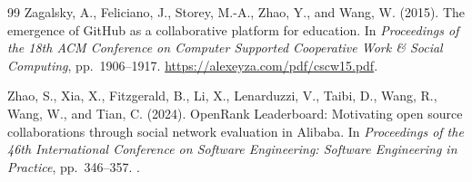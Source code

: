 \begin{thebibliography}{99}
Zagalsky, A., Feliciano, J., Storey, M.-A., Zhao, Y., and Wang, W. (2015).
The emergence of GitHub as a collaborative platform for education.
In \emph{Proceedings of the 18th ACM Conference on Computer Supported Cooperative Work \& Social Computing}, pp.~1906--1917.
\url{https://alexeyza.com/pdf/cscw15.pdf}.

Zhao, S., Xia, X., Fitzgerald, B., Li, X., Lenarduzzi, V., Taibi, D., Wang, R., Wang, W., and Tian, C. (2024).
OpenRank Leaderboard: Motivating open source collaborations through social network evaluation in Alibaba.
In \emph{Proceedings of the 46th International Conference on Software Engineering: Software Engineering in Practice}, pp.~346--357.
.
\end{thebibliography}
\endgroup
